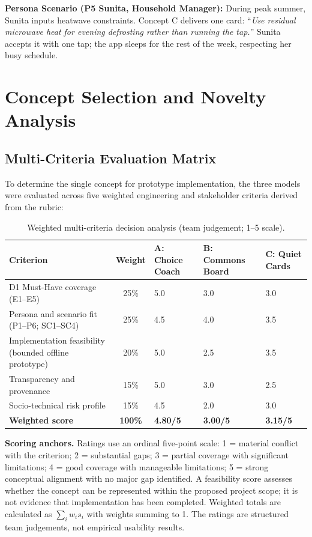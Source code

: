 \documentclass[12pt,a4paper]{article}
\begin{document}
\textbf{Persona Scenario (P5 Sunita, Household Manager):} During peak summer, Sunita inputs heatwave constraints. Concept C delivers one card: ``\emph{Use residual microwave heat for evening defrosting rather than running the tap.}'' Sunita accepts it with one tap; the app sleeps for the rest of the week, respecting her busy schedule.

\section{Concept Selection and Novelty Analysis}

\subsection{Multi-Criteria Evaluation Matrix}
To determine the single concept for prototype implementation, the three models were evaluated across five weighted engineering and stakeholder criteria derived from the rubric:

\begin{table}[ht]
\centering
\small
\caption{Weighted multi-criteria decision analysis (team judgement; 1--5 scale).}
\label{tab:mcdm}
\begin{tabularx}{\textwidth}{@{}p{3.0cm}cXXX@{}}
\toprule
\textbf{Criterion} & \textbf{Weight} & \textbf{A: Choice Coach} & \textbf{B: Commons Board} & \textbf{C: Quiet Cards}\\
\midrule
D1 Must-Have coverage (E1--E5) & 25\% & 5.0 & 3.0 & 3.0\\
Persona and scenario fit (P1--P6; SC1--SC4) & 25\% & 4.5 & 4.0 & 3.5\\
Implementation feasibility (bounded offline prototype) & 20\% & 5.0 & 2.5 & 3.5\\
Transparency and provenance & 15\% & 5.0 & 3.0 & 2.5\\
Socio-technical risk profile & 15\% & 4.5 & 2.0 & 3.0\\
\midrule
\textbf{Weighted score} & \textbf{100\%} & \textbf{4.80/5} & \textbf{3.00/5} & \textbf{3.15/5}\\
\bottomrule
\end{tabularx}
\end{table}

\textbf{Scoring anchors.} Ratings use an ordinal five-point scale: 1 = material conflict with the criterion; 2 = substantial gaps; 3 = partial coverage with significant limitations; 4 = good coverage with manageable limitations; 5 = strong conceptual alignment with no major gap identified. A feasibility score assesses whether the concept can be represented within the proposed project scope; it is not evidence that implementation has been completed. Weighted totals are calculated as $\sum_i w_i s_i$ with weights summing to 1. The ratings are structured team judgements, not empirical usability results.
\end{document}
